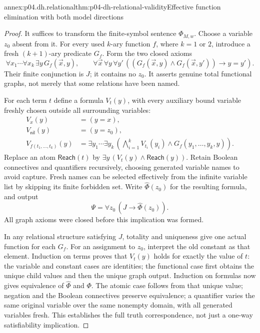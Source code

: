 \begin{annexitem}{annex:p04.dh.relational}{thm:p04-dh-relational-validity}{Effective function elimination with both model directions}
\begin{proof}
It suffices to transform the finite-symbol sentence \(\Phi_{M,w}\).
Choose a variable \(z_0\) absent from it. For every used \(k\)-ary
function \(f\), where \(k=1\) or \(2\), introduce a fresh \((k+1)\)-ary
predicate \(G_f\). Form the two closed axioms
\[
 \forall x_1\cdots\forall x_k\,\exists y\,G_f(\vec x,y),
 \qquad
 \forall\vec x\,\forall y\,\forall y'\,
 ((G_f(\vec x,y)\land G_f(\vec x,y'))\to y=y').
\]
Their finite conjunction is \(J\); it contains no \(z_0\).
It asserts genuine total functional graphs, not merely that some
relations have been named.

For each term \(t\) define a formula \(V_t(y)\), with every auxiliary
bound variable freshly chosen outside all surrounding variables:
\[
\begin{aligned}
 V_x(y)&=(y=x),\\
 V_{\mathsf{nil}}(y)&=(y=z_0),\\
 V_{f(t_1,\ldots,t_k)}(y)&=
  \exists y_1\cdots\exists y_k\,
  \left(\bigwedge_{i=1}^k V_{t_i}(y_i)
                 \land G_f(y_1,\ldots,y_k,y)\right).
\end{aligned}
\]
Replace an atom \(\mathsf{Reach}(t)\) by
\(\exists y\,(V_t(y)\land\mathsf{Reach}(y))\).
Retain Boolean connectives and quantifiers recursively, choosing generated
variable names to avoid capture. Fresh names can be selected effectively
from the infinite variable list by skipping its finite forbidden set.
Write \(\widehat\Phi(z_0)\) for the resulting formula, and output
\[
 \Psi=\forall z_0\,(J\to\widehat\Phi(z_0)).
\]
All graph axioms were closed before this implication was formed.

In any relational structure satisfying \(J\), totality and uniqueness
give one actual function for each \(G_f\). For an assignment to \(z_0\),
interpret the old constant as that element. Induction on terms proves
that \(V_t(y)\) holds for exactly the value of \(t\): the variable and
constant cases are identities; the functional case first obtains the
unique child values and then the unique graph output. Induction on
formulas now gives equivalence of \(\widehat\Phi\) and \(\Phi\).
The atomic case follows from that unique value; negation and the Boolean
connectives preserve equivalence; a quantifier varies the same original
variable over the same nonempty domain, with all generated variables
fresh. This establishes the full truth correspondence, not just a
one-way satisfiability implication.


\end{proof}
\end{annexitem}
